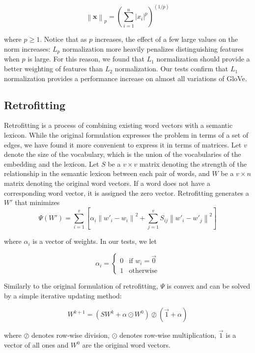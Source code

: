 \documentclass[letterpaper]{article}
\begin{document}
$$ \left\|\mathbf{x}\right\|_p
= \left(\sum_{i=1}^n \left|x_i\right|^p\right)^{(1/p)}$$

where $p \geq 1$. Notice that as $p$ increases, the effect of a few large values
on the norm increases: $L_p$ normalization more heavily penalizes
distinguishing features when $p$ is large. For this reason, we found that $L_1$
normalization should provide a better weighting of features than $L_2$
normalization.  Our tests confirm that $L_1$ normalization provides a
performance increase on almost all variations of GloVe.


\subsection{Retrofitting}

Retrofitting \cite{faruqui2015retrofitting} is a process of combining existing
word vectors with a semantic lexicon. While the original formulation expresses
the problem in terms of a set of edges, we have found it more convenient to
express it in terms of matrices. Let $v$ denote the size of the vocabulary,
which is the union of the vocabularies of the embedding and the lexicon. Let $S$ be
a $v \times v$ matrix denoting the strength of the relationship in the semantic lexicon
between each pair of words, and $W$ be a $v \times n$
matrix denoting the original word vectors. If a word does not have a
corresponding word vector, it is assigned the zero vector. Retrofitting
generates a $W'$ that minimizes
$$
\Psi \left( W' \right) = \sum_{i=1}^v \left[
  \alpha_i \left\|  w'_i - w_i \right\| ^ 2
  + \sum_{j=1}^v S_{ij} \left\| w'_i - w'_j \right\| ^ 2
\right]
$$

where $\alpha_i$ is a vector of weights. In our tests, we let

$$
\alpha_i =
  \begin{cases}
    0 & \text{if $w_i = \vec{0}$} \\
    1 & \text{otherwise}
  \end{cases}
$$

Similarly to the original formulation of retrofitting, $\Psi$ is convex and can
be solved by a simple iterative updating method:

$$
W^{k+1} = \left( S W^k + \alpha \odot W^0 \right)
\oslash \left( \vec{1} + \alpha \right)
$$

where $\oslash$ denotes row-wise division, $\odot$ denotes row-wise
multiplication, $\vec{1}$ is a vector of all ones and $W^0$ are the original
word vectors.
\end{document}

